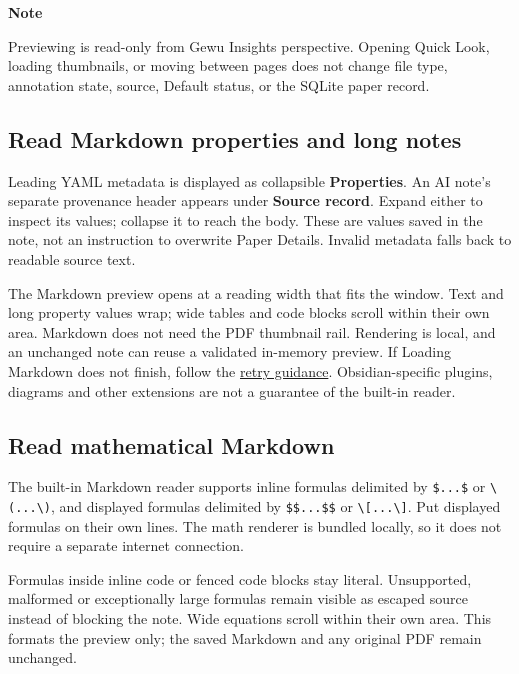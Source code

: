 \documentclass[10pt,letterpaper,oneside]{scrreprt}
\renewenvironment{quote}
  {\Needspace{5\baselineskip}\begin{tcolorbox}[enhanced,breakable,colback=GewuPale,colframe=GewuPale,boxrule=0pt,
    borderline west={1.6pt}{0pt}{GewuBlue},arc=1.2mm,left=2.5mm,right=2.5mm,top=1.7mm,bottom=1.7mm,
    before skip=4pt,after skip=5pt,fontupper=\color{GewuInk}\small]}
  {\end{tcolorbox}}
\begin{document}
\begin{quote}
\textbf{Note}

Previewing is read-only from Gewu Insight\textquotesingle s perspective. Opening Quick Look, loading thumbnails, or moving between pages does not change file type, annotation state, source, Default status, or the SQLite paper record.
\end{quote}

\subsection{Read Markdown properties and long notes}\label{read-markdown-properties-and-long-notes}

Leading YAML metadata is displayed as collapsible \textbf{Properties}. An AI note's separate provenance header appears under \textbf{Source record}. Expand either to inspect its values; collapse it to reach the body. These are values saved in the note, not an instruction to overwrite Paper Details. Invalid metadata falls back to readable source text.

The Markdown preview opens at a reading width that fits the window. Text and long property values wrap; wide tables and code blocks scroll within their own area. Markdown does not need the PDF thumbnail rail. Rendering is local, and an unchanged note can reuse a validated in-memory preview. If Loading Markdown does not finish, follow the \hyperref[troubleshooting]{retry guidance}. Obsidian-specific plugins, diagrams and other extensions are not a guarantee of the built-in reader.

\subsection{Read mathematical Markdown}\label{read-mathematical-markdown}

The built-in Markdown reader supports inline formulas delimited by \texttt{\$...\$} or \texttt{\textbackslash{}(...\textbackslash{})}, and displayed formulas delimited by \texttt{\$\$...\$\$} or \texttt{\textbackslash{}{[}...\textbackslash{}{]}}. Put displayed formulas on their own lines. The math renderer is bundled locally, so it does not require a separate internet connection.

Formulas inside inline code or fenced code blocks stay literal. Unsupported, malformed or exceptionally large formulas remain visible as escaped source instead of blocking the note. Wide equations scroll within their own area. This formats the preview only; the saved Markdown and any original PDF remain unchanged.
\end{document}
